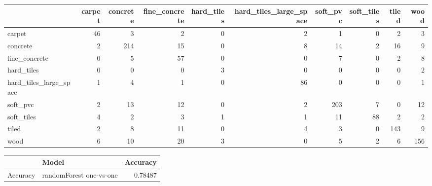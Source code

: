 \documentclass[]{article}
\newenvironment{Shaded}{\begin{snugshade}}{\end{snugshade}}
\newcommand{\CommentTok}[1]{\textcolor[rgb]{0.56,0.35,0.01}{\textit{#1}}}
\newcommand{\DataTypeTok}[1]{\textcolor[rgb]{0.13,0.29,0.53}{#1}}
\newcommand{\KeywordTok}[1]{\textcolor[rgb]{0.13,0.29,0.53}{\textbf{#1}}}
\newcommand{\NormalTok}[1]{#1}
\newcommand{\OperatorTok}[1]{\textcolor[rgb]{0.81,0.36,0.00}{\textbf{#1}}}
\newcommand{\StringTok}[1]{\textcolor[rgb]{0.31,0.60,0.02}{#1}}
\begin{document}
\begin{longtable}[]{@{}lrrrrrrrrr@{}}
\toprule
& carpet & concrete & fine\_concrete & hard\_tiles &
hard\_tiles\_large\_space & soft\_pvc & soft\_tiles & tiled &
wood\tabularnewline
\midrule
\endhead
carpet & 46 & 3 & 2 & 0 & 2 & 1 & 0 & 2 & 3\tabularnewline
concrete & 2 & 214 & 15 & 0 & 8 & 14 & 2 & 16 & 9\tabularnewline
fine\_concrete & 0 & 5 & 57 & 0 & 0 & 7 & 0 & 2 & 8\tabularnewline
hard\_tiles & 0 & 0 & 0 & 3 & 0 & 0 & 0 & 0 & 2\tabularnewline
hard\_tiles\_large\_space & 1 & 4 & 1 & 0 & 86 & 0 & 0 & 0 &
1\tabularnewline
soft\_pvc & 2 & 13 & 12 & 0 & 2 & 203 & 7 & 0 & 12\tabularnewline
soft\_tiles & 4 & 2 & 3 & 1 & 1 & 11 & 88 & 2 & 2\tabularnewline
tiled & 2 & 8 & 11 & 0 & 4 & 3 & 0 & 143 & 9\tabularnewline
wood & 6 & 10 & 20 & 3 & 0 & 5 & 2 & 6 & 156\tabularnewline
\bottomrule
\end{longtable}

\begin{Shaded}
\end{Shaded}

\begin{longtable}[]{@{}llr@{}}
\toprule
& Model & Accuracy\tabularnewline
\midrule
\endhead
Accuracy & randomForest one-vs-one & 0.78487\tabularnewline
\bottomrule
\end{longtable}
\end{document}
